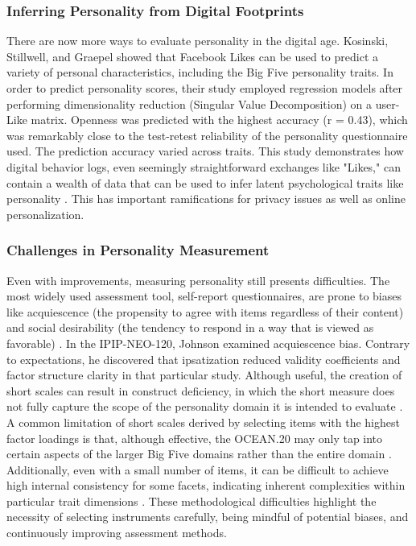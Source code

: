 \documentclass{DESSThesis}
\begin{document}
\subsubsection{Inferring Personality from Digital Footprints}
There are now more ways to evaluate personality in the digital age. Kosinski, Stillwell, and Graepel showed that Facebook Likes can be used to predict a variety of personal characteristics, including the Big Five personality traits. In order to predict personality scores, their study employed regression models after performing dimensionality reduction (Singular Value Decomposition) on a user-Like matrix. Openness was predicted with the highest accuracy (r = 0.43), which was remarkably close to the test-retest reliability of the personality questionnaire used. The prediction accuracy varied across traits. This study demonstrates how digital behavior logs, even seemingly straightforward exchanges like "Likes," can contain a wealth of data that can be used to infer latent psychological traits like personality \cite{kosinski_private_2013}. This has important ramifications for privacy issues as well as online personalization.

\subsubsection{Challenges in Personality Measurement}
Even with improvements, measuring personality still presents difficulties. The most widely used assessment tool, self-report questionnaires, are prone to biases like acquiescence (the propensity to agree with items regardless of their content) and social desirability (the tendency to respond in a way that is viewed as favorable) \cite{cobb-clark_stability_2012,johnson_measuring_2014}. In the IPIP-NEO-120, Johnson examined acquiescence bias. Contrary to expectations, he discovered that ipsatization reduced validity coefficients and factor structure clarity in that particular study. Although useful, the creation of short scales can result in construct deficiency, in which the short measure does not fully capture the scope of the personality domain it is intended to evaluate \cite{okeefe_introducing_2012}. A common limitation of short scales derived by selecting items with the highest factor loadings is that, although effective, the OCEAN.20 may only tap into certain aspects of the larger Big Five domains rather than the entire domain \cite{okeefe_introducing_2012}. Additionally, even with a small number of items, it can be difficult to achieve high internal consistency for some facets, indicating inherent complexities within particular trait dimensions \cite{johnson_measuring_2014}. These methodological difficulties highlight the necessity of selecting instruments carefully, being mindful of potential biases, and continuously improving assessment methods.
\end{document}
